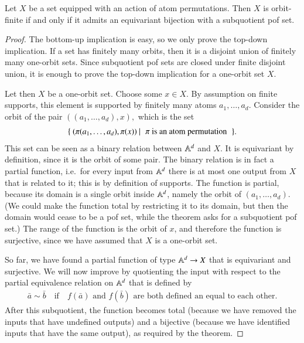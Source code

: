 \begin{theorem}\label{thm:subquotiented-pof-representation} 
    Let $X$ be a set equipped with an action of atom permutations. Then $X$ is orbit-finite if and only if it admits an equivariant bijection with a subquotient pof set.
\end{theorem}
\begin{proof}
    The bottom-up implication is easy, so we only prove the top-down implication. If a set has finitely many orbits, then it is a disjoint union of finitely many one-orbit sets. Since subquotient pof sets are closed under finite disjoint union, it is enough to prove the top-down implication for a one-orbit set $X$.
    
    Let then $X$ be a one-orbit set. Choose some $x \in X$. By assumption on finite supports, this element is supported by finitely many atoms $a_1,\ldots,a_d$. Consider the orbit of the pair 
$
((a_1,\ldots,a_d),x),
$
    which is the set
    \begin{align*}
    \setbuild{(\pi(a_1,\ldots,a_d),\pi(x))}{$\pi$ is an atom permutation}.
    \end{align*}
    This set can be seen as a binary relation between $\mathbb A^d$ and $X$. It is equivariant by definition, since it is the orbit of some pair.  The binary relation is in fact a partial function, i.e.~for every input from $\mathbb A^d$  there is at most one output from $X$ that is related to it; this is by definition of supports. The function is partial, because its domain is a single orbit inside $\mathbb A^d$, namely the  orbit of $(a_1,\ldots,a_d)$. (We could make the function total by restricting it to its domain, but then the domain would cease to be a pof set, while the theorem asks for a subquotient pof set.) The range of the function is the orbit of $x$, and therefore the function is surjective, since we have assumed that $X$ is a one-orbit set.
    
    So far, we have found a partial function of type $\mathbb A^d \to X$ that is equivariant and surjective. We will now improve by quotienting the input with respect to the partial equivalence relation on $\mathbb A^d$ that is  defined by 
    \begin{align*}
    \bar a \sim \bar b
    \quad \text{if} \quad
    \text{$f(\bar a)$ and $f(\bar b)$ are both defined an equal to each other.}
    \end{align*}
    After this subquotient, the function becomes total (because we have removed the inputs that have undefined outputs) and a bijective (because we have identified inputs that have the same output), as required by the theorem. 
\end{proof}


